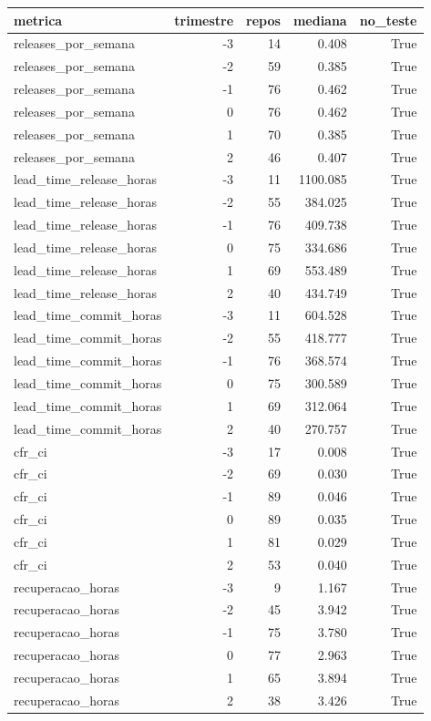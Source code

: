 \begin{tabular}{lrrrr}
\toprule
metrica & trimestre & repos & mediana & no_teste \\
\midrule
releases_por_semana & -3 & 14 & 0.408 & True \\
releases_por_semana & -2 & 59 & 0.385 & True \\
releases_por_semana & -1 & 76 & 0.462 & True \\
releases_por_semana & 0 & 76 & 0.462 & True \\
releases_por_semana & 1 & 70 & 0.385 & True \\
releases_por_semana & 2 & 46 & 0.407 & True \\
lead_time_release_horas & -3 & 11 & 1100.085 & True \\
lead_time_release_horas & -2 & 55 & 384.025 & True \\
lead_time_release_horas & -1 & 76 & 409.738 & True \\
lead_time_release_horas & 0 & 75 & 334.686 & True \\
lead_time_release_horas & 1 & 69 & 553.489 & True \\
lead_time_release_horas & 2 & 40 & 434.749 & True \\
lead_time_commit_horas & -3 & 11 & 604.528 & True \\
lead_time_commit_horas & -2 & 55 & 418.777 & True \\
lead_time_commit_horas & -1 & 76 & 368.574 & True \\
lead_time_commit_horas & 0 & 75 & 300.589 & True \\
lead_time_commit_horas & 1 & 69 & 312.064 & True \\
lead_time_commit_horas & 2 & 40 & 270.757 & True \\
cfr_ci & -3 & 17 & 0.008 & True \\
cfr_ci & -2 & 69 & 0.030 & True \\
cfr_ci & -1 & 89 & 0.046 & True \\
cfr_ci & 0 & 89 & 0.035 & True \\
cfr_ci & 1 & 81 & 0.029 & True \\
cfr_ci & 2 & 53 & 0.040 & True \\
recuperacao_horas & -3 & 9 & 1.167 & True \\
recuperacao_horas & -2 & 45 & 3.942 & True \\
recuperacao_horas & -1 & 75 & 3.780 & True \\
recuperacao_horas & 0 & 77 & 2.963 & True \\
recuperacao_horas & 1 & 65 & 3.894 & True \\
recuperacao_horas & 2 & 38 & 3.426 & True \\
\bottomrule
\end{tabular}
